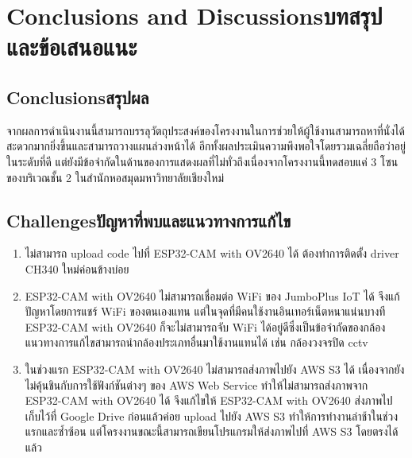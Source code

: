 \chapter{\ifenglish Conclusions and Discussions\else บทสรุปและข้อเสนอแนะ\fi}

\section{\ifenglish Conclusions\else สรุปผล\fi}

จากผลการดำเนินงานนี้สามารถบรรลุวัตถุประสงค์ของโครงงานในการช่วยให้ผู้ใช้งานสามารถหาที่นั่งได้สะดวกมากยิ่งขึ้นและสามารถวางแผนล่วงหน้าได้ อีกทั้งผลประเมินความพึงพอใจโดยรวมเฉลี่ยถือว่าอยู่ในระดับที่ดี
แต่ยังมีข้อจำกัดในด้านของการแสดงผลที่ไม่ทั่วถึงเนื่องจากโครงงานนี้ทดสอบแค่ 3 โซนของบริเวณชั้น 2 ในสำนักหอสมุดมหาวิทยาลัยเชียงใหม่

\section{\ifenglish Challenges\else ปัญหาที่พบและแนวทางการแก้ไข\fi}

\begin{enumerate}
    \item ไม่สามารถ upload code ไปที่ ESP32-CAM with OV2640 ได้ ต้องทำการติดตั้ง driver CH340 ใหม่ค่อนข้างบ่อย
    \item ESP32-CAM with OV2640 ไม่สามารถเชื่อมต่อ WiFi ของ JumboPlus IoT ได้ จึงแก้ปัญหาโดยการแชร์ WiFi ของตนเองแทน แต่ในจุดที่มีคนใช้งานอินเทอร์เน็ตหนาแน่นบางที ESP32-CAM with OV2640 ก็จะไม่สามารถจับ WiFi ได้อยู่ดีซึ่งเป็นข้อจำกัดของกล้อง แนวทางการแก้ไขสามารถนำกล้องประเภทอื่นมาใช้งานแทนได้ เช่น กล้องวงจรปิด cctv
    \item ในช่วงแรก ESP32-CAM with OV2640 ไม่สามารถส่งภาพไปยัง AWS S3 ได้ เนื่องจากยังไม่คุ้นชินกับการใช้ฟังก์ชันต่างๆ ของ AWS Web Service 
    ทำให้ไม่สามารถส่งภาพจาก ESP32-CAM with OV2640 ได้ จึงแก้ไขให้ ESP32-CAM with OV2640 ส่งภาพไปเก็บไว้ที่ Google Drive ก่อนแล้วค่อย upload ไปยัง AWS S3 ทำให้การทำงานล่าช้าในช่วงแรกและซ้ำซ้อน แต่โครงงานขณะนี้สามารถเขียนโปรแกรมให้ส่งภาพไปที่ AWS S3 โดยตรงได้แล้ว
\end{enumerate}

